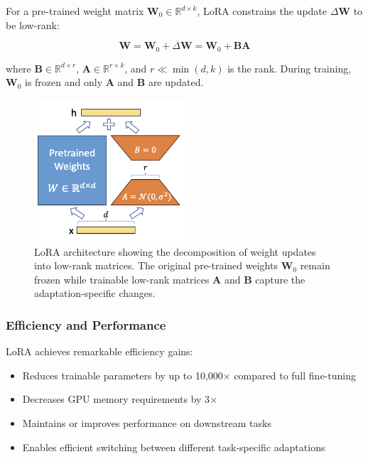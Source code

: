 For a pre-trained weight matrix $\mathbf{W}_0 \in \mathbb{R}^{d \times k}$, LoRA constrains the update $\Delta\mathbf{W}$ to be low-rank:

\begin{equation}
\mathbf{W} = \mathbf{W}_0 + \Delta\mathbf{W} = \mathbf{W}_0 + \mathbf{B}\mathbf{A}
\end{equation}

where $\mathbf{B} \in \mathbb{R}^{d \times r}$, $\mathbf{A} \in \mathbb{R}^{r \times k}$, and $r \ll \min(d,k)$ is the rank. During training, $\mathbf{W}_0$ is frozen and only $\mathbf{A}$ and $\mathbf{B}$ are updated.

\begin{figure}[H]
\centering
\includegraphics[width=0.5\textwidth]{figures/LoRA.png}
\caption{LoRA architecture showing the decomposition of weight updates into low-rank matrices. The original pre-trained weights $\mathbf{W}_0$ remain frozen while trainable low-rank matrices $\mathbf{A}$ and $\mathbf{B}$ capture the adaptation-specific changes.}
\label{fig:lora_architecture}
\end{figure}

\subsubsection{Efficiency and Performance}

LoRA achieves remarkable efficiency gains:
\begin{itemize}
    \item Reduces trainable parameters by up to 10,000$\times$ compared to full fine-tuning
    \item Decreases GPU memory requirements by 3$\times$
    \item Maintains or improves performance on downstream tasks
    \item Enables efficient switching between different task-specific adaptations
\end{itemize}


